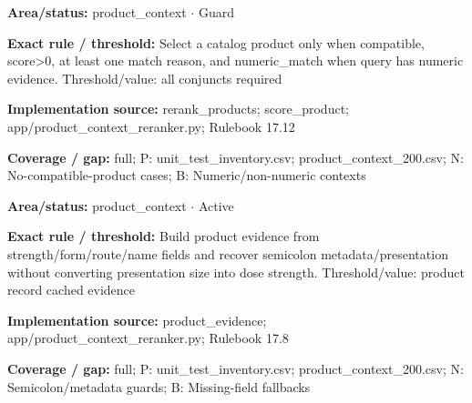 \begin{tcolorbox}[enhanced,breakable,colback=white,colframe=Muted!45,boxrule=0.45pt,arc=1.5pt,left=6pt,right=6pt,top=5pt,bottom=5pt,title={\texttt{PC-PRODUCT-ELIGIBILITY-15}},title after break={\texttt{PC-PRODUCT-ELIGIBILITY-15}\ (continued)},fonttitle=\headingfont\bfseries\color{Navy},coltitle=Navy]
\textbf{Area/status:} product\_\allowbreak{}context $\boldsymbol{\cdot}$ Guard\par
\smallskip
\textbf{Exact rule / threshold:} Select a catalog product only when compatible, score>0, at least one match reason, and numeric\_\allowbreak{}match when query has numeric evidence. Threshold/\allowbreak{}value: all conjuncts required\par
\smallskip
\textbf{Implementation source:} rerank\_\allowbreak{}products; score\_\allowbreak{}product; app/\allowbreak{}product\_\allowbreak{}context\_\allowbreak{}reranker.py; Rulebook 17.12\par
\smallskip
\textbf{Coverage / gap:} full; P: unit\_\allowbreak{}test\_\allowbreak{}inventory.csv; product\_\allowbreak{}context\_\allowbreak{}200.csv; N: No-compatible-product cases; B: Numeric/\allowbreak{}non-numeric contexts
\end{tcolorbox}
\begin{tcolorbox}[enhanced,breakable,colback=white,colframe=Muted!45,boxrule=0.45pt,arc=1.5pt,left=6pt,right=6pt,top=5pt,bottom=5pt,title={\texttt{PC-PRODUCT-EVIDENCE-10}},title after break={\texttt{PC-PRODUCT-EVIDENCE-10}\ (continued)},fonttitle=\headingfont\bfseries\color{Navy},coltitle=Navy]
\textbf{Area/status:} product\_\allowbreak{}context $\boldsymbol{\cdot}$ Active\par
\smallskip
\textbf{Exact rule / threshold:} Build product evidence from strength/\allowbreak{}form/\allowbreak{}route/\allowbreak{}name fields and recover semicolon metadata/\allowbreak{}presentation without converting presentation size into dose strength. Threshold/\allowbreak{}value: product record cached evidence\par
\smallskip
\textbf{Implementation source:} product\_\allowbreak{}evidence; app/\allowbreak{}product\_\allowbreak{}context\_\allowbreak{}reranker.py; Rulebook 17.8\par
\smallskip
\textbf{Coverage / gap:} full; P: unit\_\allowbreak{}test\_\allowbreak{}inventory.csv; product\_\allowbreak{}context\_\allowbreak{}200.csv; N: Semicolon/\allowbreak{}metadata guards; B: Missing-field fallbacks
\end{tcolorbox}
